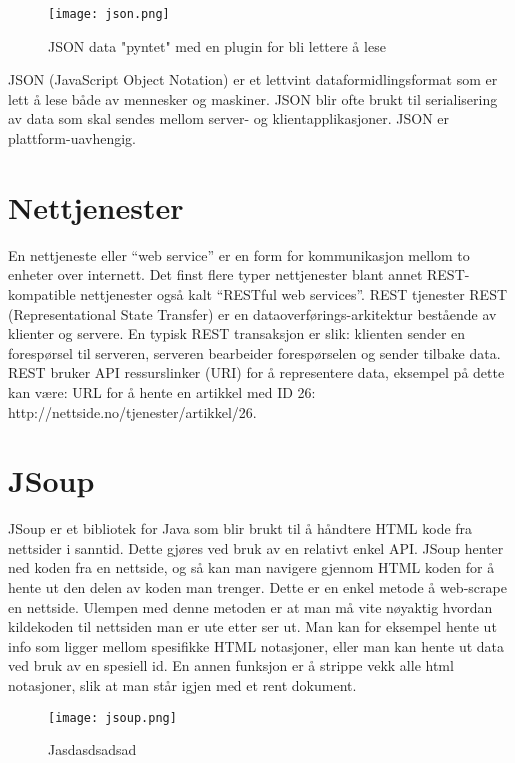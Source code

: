 \documentclass[../main.tex]{subfiles}
\begin{document}
\begin{figure}[h!]
  \centering
  \texttt{[image: json.png]}
  \caption{JSON data "pyntet" med en plugin for bli lettere å lese}
\end{figure}

JSON (JavaScript Object Notation) er et lettvint dataformidlingsformat som er lett å lese både av mennesker og maskiner. JSON blir ofte brukt til serialisering av data som skal sendes mellom server- og klientapplikasjoner. JSON er plattform-uavhengig.   

\section{Nettjenester}
En nettjeneste eller “web service” er en form for kommunikasjon mellom to enheter over internett. Det finst flere typer nettjenester blant annet REST-kompatible nettjenester også kalt “RESTful web services”. 
REST tjenester
REST (Representational State Transfer) er en dataoverførings-arkitektur bestående av klienter og servere. En typisk REST transaksjon er slik: klienten sender en forespørsel til serveren, serveren bearbeider forespørselen og sender tilbake data. REST bruker API ressurslinker (URI) for å representere data, eksempel på dette kan være: URL for å hente en artikkel med ID 26: http://nettside.no/tjenester/artikkel/26. 

\section{JSoup}
JSoup er et bibliotek for Java som blir brukt til å håndtere HTML kode fra nettsider i sanntid. Dette gjøres ved bruk av en relativt enkel API. JSoup henter ned koden fra en nettside, og så kan man navigere gjennom HTML koden for å hente ut den delen av koden man trenger. Dette er en enkel metode å web-scrape en nettside. Ulempen med denne metoden er at man må vite nøyaktig hvordan kildekoden til nettsiden man er ute etter ser ut. Man kan for eksempel hente ut info som ligger mellom spesifikke HTML notasjoner, eller man kan hente ut data ved bruk av en spesiell id. En annen funksjon er å strippe vekk alle html notasjoner, slik at man står igjen med et rent dokument.

\begin{figure}[h!]
  \centering
  \texttt{[image: jsoup.png]}
  \caption{Jasdasdsadsad}
\end{figure}
\end{document}
